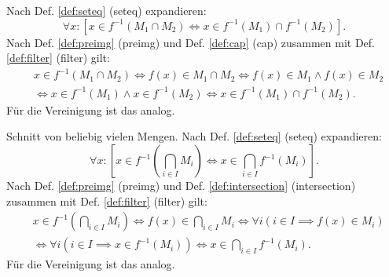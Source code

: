 \begin{Beweis}
Nach Def. \ref{def:seteq} (seteq) expandieren:
\[\forall x\colon [x\in f^{-1}(M_1\cap M_2)\iff x\in f^{-1}(M_1)\cap f^{-1}(M_2)].\]
Nach Def. \ref{def:preimg} (preimg) und Def. \ref{def:cap} (cap)
zusammen mit Def. \ref{def:filter} (filter) gilt:
\begin{align*}
& x\in f^{-1}(M_1\cap M_2) \iff f(x)\in M_1\cap M_2
\iff f(x)\in M_1\land f(x)\in M_2\\
&\iff x\in f^{-1}(M_1)\land x\in f^{-1}(M_2)
\iff x\in f^{-1}(M_1)\cap f^{-1}(M_2).
\end{align*}
Für die Vereinigung ist das analog.

Schnitt von beliebig vielen Mengen.
Nach Def. \ref{def:seteq} (seteq) expandieren:
\[\forall x\colon [x\in f^{-1}(\bigcap_{i\in I}M_i)
\iff x\in \bigcap_{i\in I} f^{-1}(M_i)].\]
Nach Def. \ref{def:preimg} (preimg) und Def. \ref{def:intersection}
(intersection) zusammen mit Def. \ref{def:filter} (filter) gilt:
\begin{align*}
& x\in f^{-1}(\bigcap_{i\in I} M_i)\iff f(x)\in\bigcap_{i\in I} M_i
\iff \forall i(i\in I\implies f(x)\in M_i)\\
&\iff \forall i(i\in I\implies x\in f^{-1}(M_i))
\iff x\in \bigcap_{i\in I} f^{-1}(M_i).
\end{align*}
Für die Vereinigung ist das analog.\;\qedsymbol
\end{Beweis}

